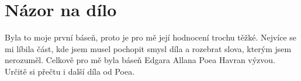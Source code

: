 \documentclass[12pt,a4paper]{article}
\begin{document}
\section*{Názor na dílo}

Byla to moje první báseň, proto je pro mě její hodnocení trochu těžké. Nejvíce se mi líbila část, kde jsem musel pochopit smysl díla a rozebrat slova, kterým jsem nerozuměl. Celkově pro mě byla báseň Edgara Allana Poea Havran výzvou. Určitě si přečtu i další díla od Poea.
\end{document}
